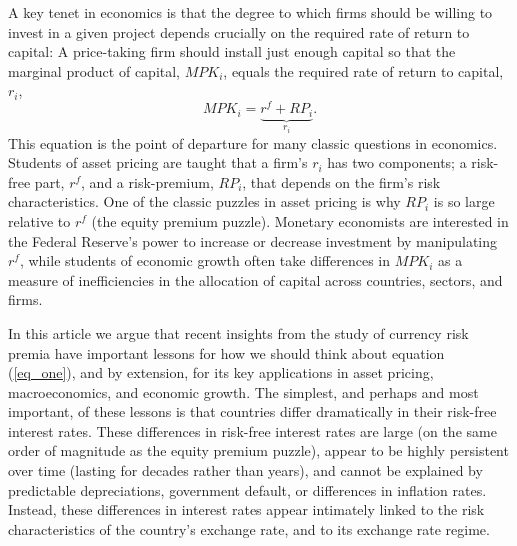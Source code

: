 \documentclass{ar-1col}
\begin{document}
A key tenet in economics is that the degree to which firms should be
willing to invest in a given project depends crucially on the required
rate of return to capital: A price-taking firm should install just
enough capital so that the marginal product of capital, $MPK_i$,
equals the required rate of return to capital,$r_i$,
\begin{equation}
  MPK_i=\underbrace{r^f+RP_i}_{r_i}.
  \label{eq_one}
\end{equation} 
This equation is the point of departure for many classic questions in
economics. Students of asset pricing are taught that a firm's $r_i$
has two components; a risk-free part, $r^f$, and a risk-premium,
$RP_i$, that depends on the firm's risk characteristics. One of the
classic puzzles in asset pricing is why $RP_i$ is so large relative to
$r^f$ (the equity premium puzzle). Monetary economists are interested
in the Federal Reserve's power to increase or decrease investment by
manipulating $r^f$, while students of economic growth often take
differences in $MPK_i$ as a measure of inefficiencies in the
allocation of capital across countries, sectors, and firms.

In this article we argue that recent insights from the study of
currency risk premia have important lessons for how we should think
about equation (\ref{eq_one}), and by extension, for its key
applications in asset pricing, macroeconomics, and economic growth.
The simplest, and perhaps and most important, of these lessons is that
countries differ dramatically in their risk-free interest rates. These
differences in risk-free interest rates are large (on the same order
of magnitude as the equity premium puzzle), appear to be highly
persistent over time (lasting for decades rather than years), and
cannot be explained by predictable depreciations, government default,
or differences in inflation rates. Instead, these differences in
interest rates appear intimately linked to the risk characteristics of
the country's exchange rate, and to its exchange rate regime.
\end{document}
